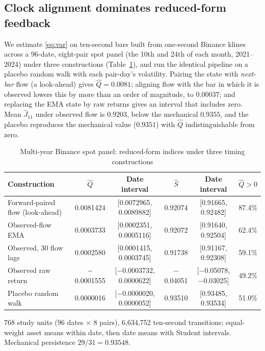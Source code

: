\subsection{Clock alignment dominates reduced-form feedback}

We estimate \eqref{eq:var} on ten-second bars built from one-second Binance klines across a 96-date, eight-pair spot panel (the 10th and 24th of each month, 2021--2024) under three constructions (Table~\ref{tab:panel}), and run the identical pipeline on a placebo random walk with each pair-day's volatility. Pairing the state with \emph{next-bar} flow (a look-ahead) gives $\hat Q=0.0081$; aligning flow with the bar in which it is observed lowers this by more than an order of magnitude, to $0.00037$; and replacing the EMA state by raw returns gives an interval that includes zero. Mean $\hat J_{11}$ under observed flow is $0.9203$, below the mechanical $0.9355$, and the placebo reproduces the mechanical value ($0.9351$) with $\hat Q$ indistinguishable from zero. 

\begin{table}[t]\centering\small
\begin{threeparttable}
\caption{Multi-year Binance spot panel: reduced-form indices under three timing constructions}\label{tab:panel}
\setlength{\tabcolsep}{2.5pt}
\renewcommand{\arraystretch}{1.1}
\begin{tabular}{p{}ccccc}
\toprule
Construction & $\hat Q$ & Date interval & $\hat S$ & Date interval & $\hat Q>0$\\
\midrule
Forward-paired flow (look-ahead) & 0.0081424 & [0.0072965, 0.0089882] & 0.92074 & [0.91665, 0.92482] & 87.4\%\\
Observed-flow EMA & 0.0003733 & [0.0002351, 0.0005116] & 0.92072 & [0.91640, 0.92504] & 62.4\%\\
Observed, 30 flow lags & 0.0002580 & [0.0001415, 0.0003745] & 0.91738 & [0.91167, 0.92308] & 59.1\%\\
Observed raw return & $-$0.0001555 & [$-$0.0003732, 0.0000622] & $-$0.04051 & [$-$0.05078, $-$0.03025] & 49.2\%\\
Placebo random walk & 0.0000016 & [$-$0.0000020, 0.0000052] & 0.93510 & [0.93485, 0.93534] & 51.0\%\\
\bottomrule
\end{tabular}
\begin{tablenotes}\footnotesize\item 768 study units (96 dates $\times$ 8 pairs), 6{,}634{,}752 ten-second transitions; equal-weight asset means within date, then date means with Student intervals. Mechanical persistence $29/31=0.93548$. \end{tablenotes}
\end{threeparttable}
\end{table}

